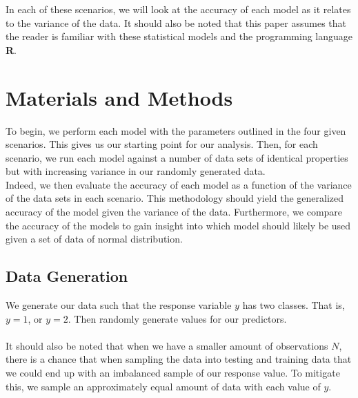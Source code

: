 \documentclass[11pt, oneside]{article}
\begin{document}
In each of these scenarios, we will look at the accuracy of each model as it relates to the variance of the data. It should also be noted that this paper assumes that the reader is familiar with these statistical models and the programming language \textbf\textsf{R}.

\pagebreak




\section*{Materials and Methods}
To begin, we perform each model with the parameters outlined in the four given scenarios. This gives us our starting point for our analysis. Then, for each scenario, we run each model against a number of data sets of identical properties but with increasing variance in our randomly generated data.\\
Indeed, we then evaluate the accuracy of each model as a function of the variance of the data sets in each scenario. This methodology should yield the generalized accuracy of the model given the variance of the data.
Furthermore, we compare the accuracy of the models to gain insight into which model should likely be used given a set of data of normal distribution.
 

\subsection*{Data Generation} 
We generate our data such that the response variable $y$ has two classes. That is, $y=1$, or $y=2$. Then randomly generate values for our predictors.\\
\\
It should also be noted that when we have a smaller amount of observations $N$, there is a chance that when sampling the data into testing and training data that we could end up with an imbalanced sample of our response value. To mitigate this, we sample an approximately equal amount of data with each value of $y$.\\
\end{document}
